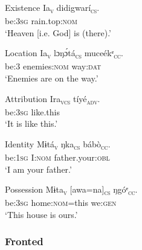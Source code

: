 Existence
\ea\label{ex:syn:26}
\gll Ia\textsc{\textsubscript{v}}     didigwarí\textsc{\textsubscript{cs}}. \\
be:\textsc{3sg}   rain.top:\textsc{nom}    \\
\glt ‘Heaven [i.e. God] is (there).’ 
\z




Location
\ea\label{ex:syn:27}
\gll Ia\textsc{\textsubscript{v}}   lɔŋ\'{ɔ}tá\textsc{\textsubscript{cs}}     muceékᵉ\textsc{\textsubscript{cc}}. \\
be:3   enemies:\textsc{nom}   way:\textsc{dat}    \\
\glt ‘Enemies are on the way.’ 
\z




Attribution
\ea\label{ex:syn:28}
\gll Ira\textsc{\textsubscript{vcs}}     tíyé\textsc{\textsubscript{adv}}. \\
be:\textsc{3sg}   like.this    \\

\glt ‘It is like this.’ 
\z




Identity
\ea\label{ex:syn:29}
\gll Mɨt{\Í}á\textsc{\textsubscript{v}}   ŋka\textsc{\textsubscript{cs}}    bábò\textsc{\textsubscript{cc}}.\\
be:\textsc{1sg}   I:\textsc{nom}    father.your:\textsc{obl}\\
\glt ‘I am your father.’ 
\z




Possession
\ea\label{ex:syn:30}
\gll Mɨta\textsc{\textsubscript{v}}     [awa=na]\textsc{\textsubscript{cs}}   ŋgóᵉ\textsc{\textsubscript{cc}}.\\
be:\textsc{3sg}   home:\textsc{nom}=this   we:\textsc{gen}\\
\glt ‘This house is ours.’ 
\z




\subsubsection{Fronted}\label{sec:10.2.7}

